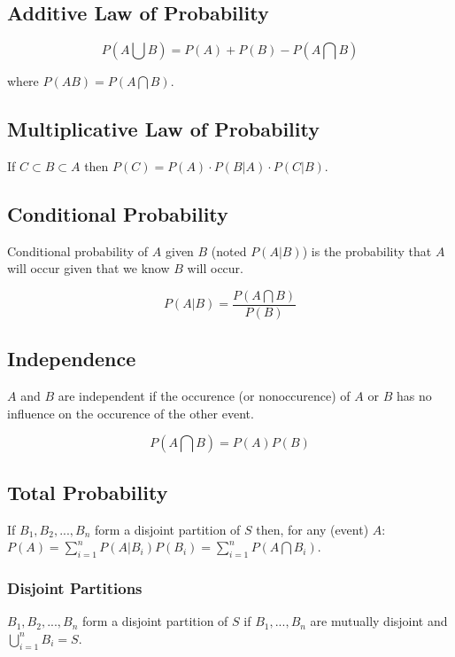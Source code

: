 \documentclass{article}
\begin{document}
\subsection{Additive Law of Probability}
\begin{equation}
  P(A \bigcup B) = P(A) + P(B) - P(A \bigcap B)
\end{equation}

where $P(AB) = P(A \bigcap B)$.

\subsection{Multiplicative Law of Probability}
If $C \subset B \subset A$ then $P(C) = P(A) \cdot P(B|A) \cdot P(C|B)$.

\subsection{Conditional Probability}
Conditional probability of $A$ given $B$ (noted $P(A|B)$) is the probability
that $A$ will occur given that we know $B$ will occur.

\begin{equation}
  P(A|B) = \frac{P(A \bigcap B)}{P(B)}
\end{equation}

\subsection{Independence}
$A$ and $B$ are independent if the occurence (or nonoccurence) of $A$ or $B$
has no influence on the occurence of the other event.

\begin{equation}
  P(A \bigcap B) = P(A)P(B)
\end{equation}

\subsection{Total Probability}
If $B_1, B_2, ..., B_n$ form a disjoint partition of $S$ then, for any (event)
$A$: $P(A) = \sum_{i=1}^{n}P(A|B_i)P(B_i) = \sum_{i=1}^n P(A \bigcap B_i)$.

\subsubsection{Disjoint Partitions}
$B_1, B_2, ..., B_n$ form a disjoint partition of $S$ if $B_1,...,B_n$ are
mutually disjoint and $\bigcup_{i=1}^{n}B_i = S$.
\end{document}
